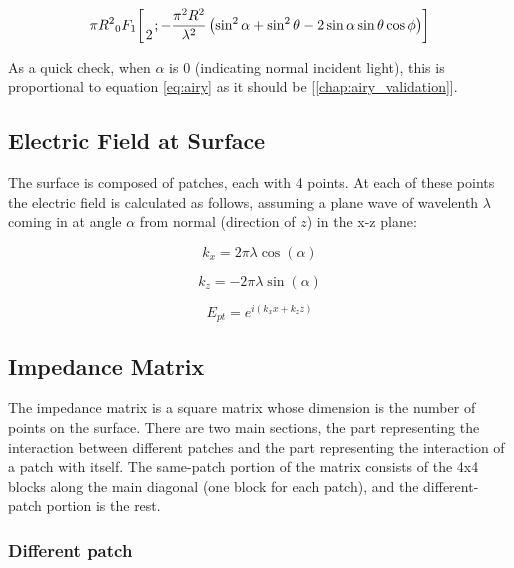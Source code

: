 \documentclass[etd,oneside,senior]{BYUPhys}
\newcommand*\pFqskip{8mu}
\newcommand*\pFq{\begingroup
        \catcode`\,\active
        \def ,{\mskip\pFqskip\relax}%
        \dopFq
}
\def\dopFq#1#2#3#4#5{%
        {}_{#1}F_{#2}\biggl[\genfrac..{0pt}{}{#3}{#4};#5\biggr]%
        \endgroup
}
\begin{document}
\begin{equation}
  \pi R^2 \pFq{0}{1}{}{2}{-\frac{\pi^2 R^2}{\lambda^2}\left(\sin^2\alpha+\sin^2\theta-2\sin\alpha\sin\theta\cos\phi\right)}
\end{equation}

As a quick check, when $\alpha$ is 0 (indicating normal incident light), this is proportional to equation \ref{eq:airy} as it should be [\ref{chap:airy_validation}].



\subsection{Electric Field at Surface}\label{chap:efield}

The surface is composed of patches, each with 4 points. At each of these points the electric field is calculated as follows, assuming a plane wave of wavelenth $\lambda$ coming in at angle $\alpha$ from normal (direction of $z$) in the x-z plane:

\begin{equation}
  k_{x}=2\pi\lambda\cos\left(\alpha\right)
\end{equation}

\begin{equation}
  k_{z}=-2\pi\lambda\sin\left(\alpha\right)
\end{equation}

\begin{equation}
  E_{pt}=e^{i\left(k_{x}x+k_{z}z\right)}
\end{equation}



\subsection{Impedance Matrix}

The impedance matrix is a square matrix whose dimension is the number of points on the surface. There are two main sections, the part representing the interaction between different patches and the part representing the interaction of a patch with itself. The same-patch portion of the matrix consists of the 4x4 blocks along the main diagonal (one block for each patch), and the different-patch portion is the rest.

\subsubsection{Different patch}
\end{document}
